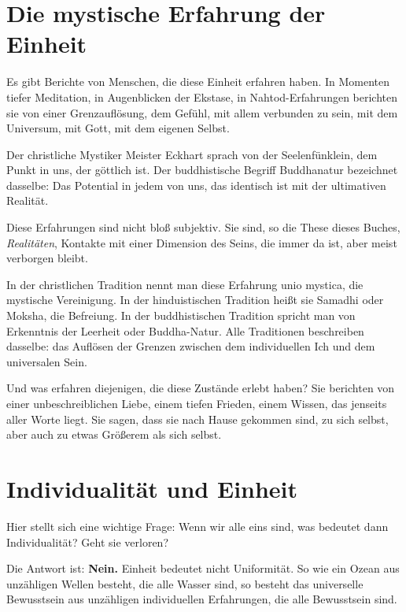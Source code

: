 \section{Die mystische Erfahrung der Einheit}

Es gibt Berichte von Menschen, die diese Einheit erfahren haben. In Momenten tiefer Meditation, in Augenblicken der Ekstase, in Nahtod-Erfahrungen berichten sie von einer Grenzauflösung, dem Gefühl, mit allem verbunden zu sein, mit dem Universum, mit Gott, mit dem eigenen Selbst.

Der christliche Mystiker Meister Eckhart \cite{Eckhart1300} sprach von der \glqq Seelenfünklein\grqq{}, dem Punkt in uns, der göttlich ist. Der buddhistische Begriff \glqq Buddhanatur\grqq{} bezeichnet dasselbe: Das Potential in jedem von uns, das identisch ist mit der ultimativen Realität.

Diese Erfahrungen sind nicht bloß subjektiv. Sie sind, so die These dieses Buches, \emph{Realitäten}, Kontakte mit einer Dimension des Seins, die immer da ist, aber meist verborgen bleibt.

In der christlichen Tradition nennt man diese Erfahrung \glqq unio mystica\grqq{}, die mystische Vereinigung. In der hinduistischen Tradition heißt sie \glqq Samadhi\grqq{} oder \glqq Moksha\grqq{}, die Befreiung. In der buddhistischen Tradition spricht man von \glqq Erkenntnis der Leerheit\grqq{} oder \glqq Buddha-Natur\grqq{}. Alle Traditionen beschreiben dasselbe: das Auflösen der Grenzen zwischen dem individuellen Ich und dem universalen Sein.

Und was erfahren diejenigen, die diese Zustände erlebt haben? Sie berichten von einer unbeschreiblichen Liebe, einem tiefen Frieden, einem Wissen, das jenseits aller Worte liegt. Sie sagen, dass sie \glqq nach Hause\grqq{} gekommen sind, zu sich selbst, aber auch zu etwas Größerem als sich selbst.

\section{Individualität und Einheit}

Hier stellt sich eine wichtige Frage: Wenn wir alle eins sind, was bedeutet dann Individualität? Geht sie verloren?

Die Antwort ist: \textbf{Nein.} Einheit bedeutet nicht Uniformität. So wie ein Ozean aus unzähligen Wellen besteht, die alle Wasser sind, so besteht das universelle Bewusstsein aus unzähligen individuellen Erfahrungen, die alle Bewusstsein sind.

